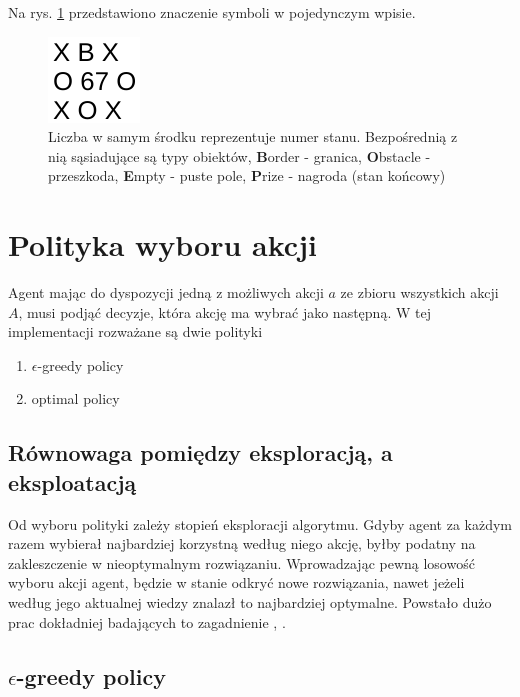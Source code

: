 Na rys. \ref{fig:wyjasnieniewpisu} przedstawiono znaczenie symboli w pojedynczym wpisie.

\begin{figure}[H]
    \centering
    \includegraphics[scale=1]{wyjasnieniewpisu}
    \caption{Liczba w samym środku reprezentuje numer stanu. Bezpośrednią z nią sąsiadujące są typy obiektów, 
\textbf{B}order - granica, \textbf{O}bstacle - przeszkoda, \textbf{E}mpty - puste pole, \textbf{P}rize - nagroda (stan 
końcowy)}
    \label{fig:wyjasnieniewpisu}
\end{figure}


\section{Polityka wyboru akcji}
\label{sec:politykawyboru}

Agent mając do dyspozycji jedną z możliwych akcji $a$ ze zbioru wszystkich akcji $A$, musi podjąć decyzje, która akcję 
ma wybrać jako następną. W tej implementacji rozważane są dwie polityki
\begin{enumerate}
	\item $\epsilon$-greedy policy
	\item optimal policy
\end{enumerate}

\subsection{Równowaga pomiędzy eksploracją, a eksploatacją}
Od wyboru polityki zależy stopień eksploracji algorytmu. Gdyby agent za każdym razem wybierał najbardziej korzystną 
według niego akcję, byłby podatny na zakleszczenie w nieoptymalnym rozwiązaniu. Wprowadzając pewną losowość wyboru akcji 
agent, będzie w stanie odkryć nowe rozwiązania, nawet jeżeli według jego aktualnej wiedzy znalazł to najbardziej 
optymalne. Powstało dużo prac dokładniej badających to zagadnienie \cite{thrun1992efficient}, 
\cite{wiewiora2004efficient}.

\subsection{$\epsilon$-greedy policy}

